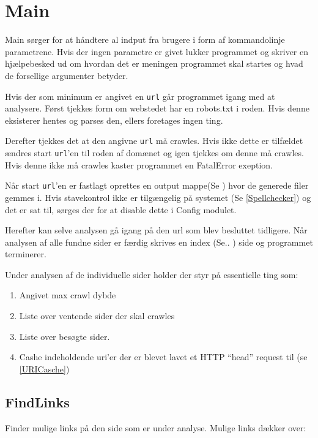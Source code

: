 \documentclass[a4paper,oneside,article]{memoir}
\begin{document}
\section{Main}

Main sørger for at håndtere al indput fra brugere i form af
kommandolinje parametrene. Hvis der ingen parametre er givet lukker
programmet og skriver en hjælpebesked ud om hvordan det er meningen
programmet skal startes og hvad de forsellige argumenter betyder.

Hvis der som minimum er angivet en \texttt{url} går programmet igang
med at analysere.  Først tjekkes form om webstedet har en robots.txt i
roden. Hvis denne eksisterer hentes og parses den, ellers foretages
ingen ting.

Derefter tjekkes det at den angivne \texttt{url} må crawles. Hvis ikke
dette er tilfældet ændres start \texttt{url}'en til roden af domænet
og igen tjekkes om denne må crawles. Hvis denne ikke må crawles kaster
programmet en FatalError exeption.

Når start \texttt{url}'en er fastlagt oprettes en output mappe(Se ) hvor de generede filer gemmes i.
Hvis stavekontrol ikke er tilgængelig på systemet
(Se \ref{Spellchecker}) og det er sat til, sørges der for at
disable dette i Config modulet.

Herefter kan selve analysen gå igang på den url som blev besluttet
tidligere.  Når analysen af alle fundne sider er færdig skrives en
index (Se.. ) side og programmet terminerer.


Under analysen af de individuelle sider holder der styr på essentielle ting som:

\begin{enumerate}
 \item Angivet max crawl dybde
 \item Liste over ventende sider der skal crawles
 \item Liste over besøgte sider.
 \item Cashe indeholdende uri'er der er blevet lavet et HTTP ``head'' request til (se \ref{URICasche})
\end{enumerate}

\subsection{FindLinks}
Finder mulige links på den side som er under analyse. Mulige links dækker over:
\end{document}
